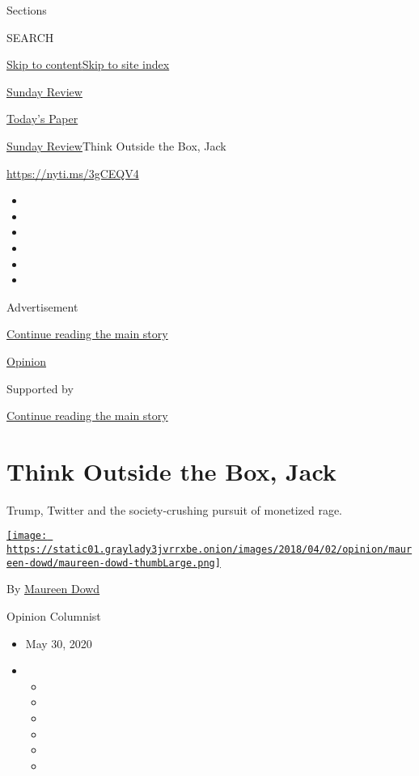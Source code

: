 Sections

SEARCH

\protect\hyperlink{site-content}{Skip to
content}\protect\hyperlink{site-index}{Skip to site index}

\href{https://www.nytimes3xbfgragh.onion/section/opinion/sunday}{Sunday
Review}

\href{https://myaccount.nytimes3xbfgragh.onion/auth/login?response_type=cookie\&client_id=vi}{}

\href{https://www.nytimes3xbfgragh.onion/section/todayspaper}{Today's
Paper}

\href{/section/opinion/sunday}{Sunday Review}\textbar{}Think Outside the
Box, Jack

\url{https://nyti.ms/3gCEQV4}

\begin{itemize}
\item
\item
\item
\item
\item
\item
\end{itemize}

Advertisement

\protect\hyperlink{after-top}{Continue reading the main story}

\href{/section/opinion}{Opinion}

Supported by

\protect\hyperlink{after-sponsor}{Continue reading the main story}

\hypertarget{think-outside-the-box-jack}{%
\section{Think Outside the Box, Jack}\label{think-outside-the-box-jack}}

Trump, Twitter and the society-crushing pursuit of monetized rage.

\href{https://www.nytimes3xbfgragh.onion/by/maureen-dowd}{\texttt{[image: https://static01.graylady3jvrrxbe.onion/images/2018/04/02/opinion/maureen-dowd/maureen-dowd-thumbLarge.png]}}

By \href{https://www.nytimes3xbfgragh.onion/by/maureen-dowd}{Maureen
Dowd}

Opinion Columnist

\begin{itemize}
\item
  May 30, 2020
\item
  \begin{itemize}
  \item
  \item
  \item
  \item
  \item
  \item
  \end{itemize}
\end{itemize}

